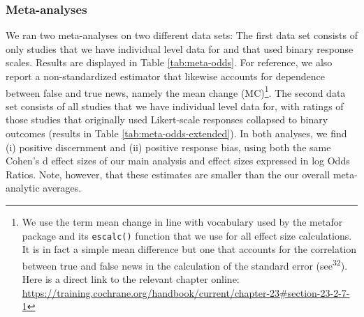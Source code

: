 \documentclass[
  doc,floatsintext]{apa6}
\begin{document}
\subsubsection{Meta-analyses}\label{meta-analyses}

We ran two meta-analyses on two different data sets: The first data set consists of only studies that we have individual level data for and that used binary response scales. Results are displayed in Table \ref{tab:meta-odds}. For reference, we also report a non-standardized estimator that likewise accounts for dependence between false and true news, namely the mean change (MC)\footnote{We use the term mean change in line with vocabulary used by the metafor package and its \texttt{escalc()} function that we use for all effect size calculations. It is in fact a simple mean difference but one that accounts for the correlation between true and false news in the calculation of the standard error (see\textsuperscript{32}). Here is a direct link to the relevant chapter online: \url{https://training.cochrane.org/handbook/current/chapter-23\#section-23-2-7-1}}. The second data set consists of all studies that we have individual level data for, with ratings of those studies that originally used Likert-scale responses collapsed to binary outcomes (results in Table \ref{tab:meta-odds-extended}). In both analyses, we find (i) positive discernment and (ii) positive response bias, using both the same Cohen's d effect sizes of our main analysis and effect sizes expressed in log Odds Ratios. Note, however, that these estimates are smaller than the our overall meta-analytic averages.
\end{document}
